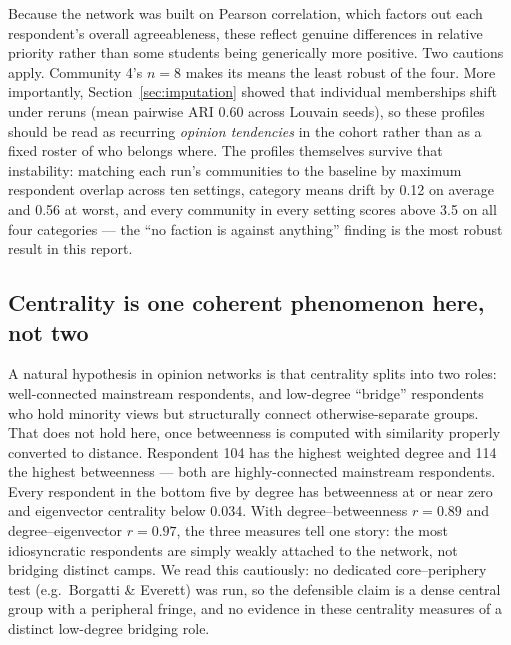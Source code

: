 \documentclass[11pt,a4paper]{article}
\begin{document}
Because the network was built on Pearson correlation, which factors out each respondent's overall agreeableness, these reflect genuine differences in relative priority rather than some students being generically more positive. Two cautions apply. Community 4's $n = 8$ makes its means the least robust of the four. More importantly, Section~\ref{sec:imputation} showed that individual memberships shift under reruns (mean pairwise ARI 0.60 across Louvain seeds), so these profiles should be read as recurring \emph{opinion tendencies} in the cohort rather than as a fixed roster of who belongs where. The profiles themselves survive that instability: matching each run's communities to the baseline by maximum respondent overlap across ten settings, category means drift by 0.12 on average and 0.56 at worst, and every community in every setting scores above 3.5 on all four categories --- the ``no faction is against anything'' finding is the most robust result in this report.

\subsection{Centrality is one coherent phenomenon here, not two}\label{sec:centrality}
A natural hypothesis in opinion networks is that centrality splits into two roles: well-connected mainstream respondents, and low-degree ``bridge'' respondents who hold minority views but structurally connect otherwise-separate groups. That does not hold here, once betweenness is computed with similarity properly converted to distance. Respondent 104 has the highest weighted degree and 114 the highest betweenness --- both are highly-connected mainstream respondents. Every respondent in the bottom five by degree has betweenness at or near zero and eigenvector centrality below 0.034. With degree--betweenness $r = 0.89$ and degree--eigenvector $r = 0.97$, the three measures tell one story: the most idiosyncratic respondents are simply weakly attached to the network, not bridging distinct camps. We read this cautiously: no dedicated core--periphery test (e.g.\ Borgatti \& Everett) was run, so the defensible claim is a dense central group with a peripheral fringe, and no evidence in these centrality measures of a distinct low-degree bridging role.
\end{document}
